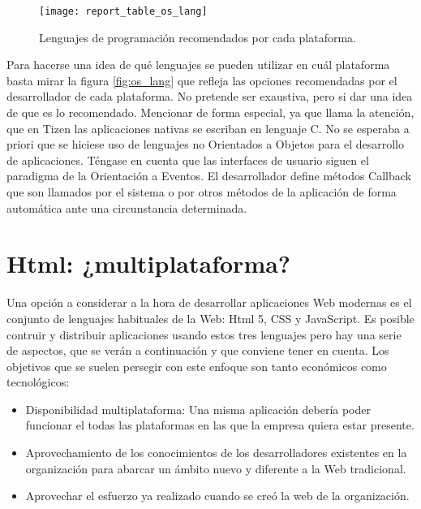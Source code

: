 \documentclass[
10pt, %
a4paper, %
oneside, %
headinclude,footinclude, %
BCOR5mm, %
]{scrartcl}
\begin{document}
\begin{figure}[h]
\centering 
\texttt{[image: report\_table\_os\_lang]} 
\caption[Lenguajes recomendados por cada plataforma]{Lenguajes de programación recomendados por cada plataforma.} 
\label{fig:os_lang} 
\end{figure}

Para hacerse una idea de qué lenguajes se pueden utilizar en cuál plataforma basta mirar la figura \vref{fig:os_lang} que refleja las opciones recomendadas por el desarrollador de cada plataforma. No pretende ser exaustiva, pero si dar una idea de que es lo recomendado. Mencionar de forma especial, ya que llama la atención, que en Tizen las aplicaciones nativas se escriban en lenguaje C. No se esperaba a priori que se hiciese uso de lenguajes no Orientados a Objetos para el desarrollo de aplicaciones. Téngase en cuenta que las interfaces de usuario siguen el paradigma de la Orientación a Eventos. El desarrollador define métodos Callback que son llamados por el sistema o por otros métodos de la aplicación de forma automática ante una circunstancia determinada.

\section{Html: ¿multiplataforma?}
Una opción a considerar a la hora de desarrollar aplicaciones Web modernas es el conjunto de lenguajes habituales de la Web: Html 5, CSS y JavaScript. Es posible contruir y distribuir aplicaciones usando estos tres lenguajes pero hay una serie de aspectos, que se verán a continuación y que conviene tener en cuenta. Los objetivos que se suelen persegir con este enfoque son tanto económicos como tecnológicos: 

\begin{itemize}
\item Disponibilidad multiplataforma: Una misma aplicación debería poder funcionar el todas las plataformas en las que la empresa quiera estar presente.
\item Aprovechamiento de los conocimientos de los desarrolladores existentes en la organización para abarcar un ámbito nuevo y diferente a la Web tradicional.
\item Aprovechar el esfuerzo ya realizado cuando se creó la web de la organización.
\end{itemize}
\end{document}
